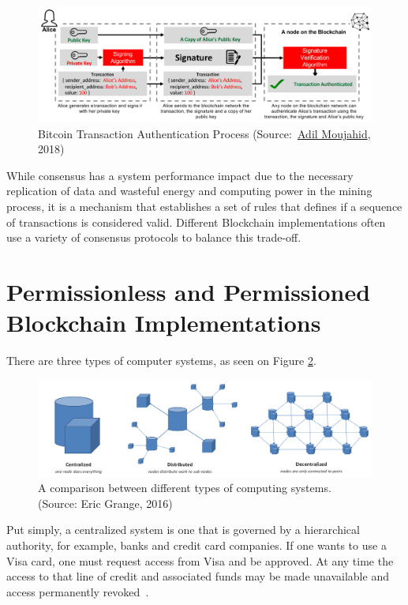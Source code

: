 \begin{figure}[h]
	\centering
	\includegraphics[width=1\linewidth]{imgs/bitcoinTransaction.png}
  \caption{\label{fig:bitcoinTransaction} Bitcoin Transaction Authentication
  Process
  (Source:~\href{http://adilmoujahid.com/images/blockchain-public-crypto.png}{Adil
  Moujahid}, 2018)}
\end{figure}

While consensus has a system performance impact due to the necessary
replication of data and wasteful energy and computing power in the mining
process, it is a mechanism that establishes a set of rules that defines if a
sequence of transactions is considered valid.  Different Blockchain
implementations often use a variety of consensus protocols to balance this
trade-off.

\section{Permissionless and Permissioned Blockchain Implementations}

There are three types of computer systems, as seen on Figure
\ref{fig:typesofnetworks}.

\begin{figure}[h]
	\centering
	\includegraphics[width=1\linewidth]{imgs/typesofnetworks.png}
  \caption{\label{fig:typesofnetworks} A comparison between different types of
  computing systems. (Source: Eric Grange, 2016)}
\end{figure}

Put simply, a centralized system is one that is governed by a hierarchical
authority, for example, banks and credit card companies. If one wants to use a
Visa card, one must request access from Visa and be approved. At any time the
access to that line of credit and associated funds may be made unavailable and
access permanently revoked~\cite{Dreifuerst2018}.


